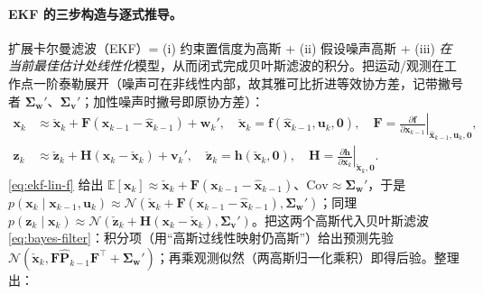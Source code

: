 \paragraph{EKF 的三步构造与逐式推导。}
扩展卡尔曼滤波（EKF）= (i) 约束置信度为高斯 + (ii) 假设噪声高斯 + (iii) \emph{在当前最佳估计处线性化}模型，从而闭式完成贝叶斯滤波的积分\cite{barfoot2024state,gaoxiang2019slam14}。把运动/观测在工作点一阶泰勒展开（噪声可在非线性内部，故其雅可比折进等效协方差，记带撇号者 $\boldsymbol{\Sigma}_{\mathbf{w}}'$、$\boldsymbol{\Sigma}_{\mathbf{v}}'$；加性噪声时撇号即原协方差）：
\begin{align}
  \mathbf{x}_k&\approx\check{\mathbf{x}}_k+\mathbf{F}(\mathbf{x}_{k-1}-\hat{\mathbf{x}}_{k-1})+\mathbf{w}_k',\quad
  \check{\mathbf{x}}_k=\mathbf{f}(\hat{\mathbf{x}}_{k-1},\mathbf{u}_k,\mathbf{0}),\quad
  \mathbf{F}=\left.\frac{\partial\mathbf{f}}{\partial\mathbf{x}_{k-1}}\right|_{\hat{\mathbf{x}}_{k-1},\mathbf{u}_k,\mathbf{0}},\label{eq:ekf-lin-f}\\
  \mathbf{z}_k&\approx\check{\mathbf{z}}_k+\mathbf{H}(\mathbf{x}_k-\check{\mathbf{x}}_k)+\mathbf{v}_k',\quad
  \check{\mathbf{z}}_k=\mathbf{h}(\check{\mathbf{x}}_k,\mathbf{0}),\quad
  \mathbf{H}=\left.\frac{\partial\mathbf{h}}{\partial\mathbf{x}_k}\right|_{\check{\mathbf{x}}_k,\mathbf{0}}.\label{eq:ekf-lin-h}
\end{align}
\cref{eq:ekf-lin-f} 给出 $\mathbb{E}[\mathbf{x}_k]\approx\check{\mathbf{x}}_k+\mathbf{F}(\mathbf{x}_{k-1}-\hat{\mathbf{x}}_{k-1})$、$\mathrm{Cov}\approx\boldsymbol{\Sigma}_{\mathbf{w}}'$，于是 $p(\mathbf{x}_k\mid\mathbf{x}_{k-1},\mathbf{u}_k)\approx\mathcal{N}(\check{\mathbf{x}}_k+\mathbf{F}(\mathbf{x}_{k-1}-\hat{\mathbf{x}}_{k-1}),\boldsymbol{\Sigma}_{\mathbf{w}}')$；同理 $p(\mathbf{z}_k\mid\mathbf{x}_k)\approx\mathcal{N}(\check{\mathbf{z}}_k+\mathbf{H}(\mathbf{x}_k-\check{\mathbf{x}}_k),\boldsymbol{\Sigma}_{\mathbf{v}}')$。把这两个高斯代入贝叶斯滤波 \cref{eq:bayes-filter}：积分项（用“高斯过线性映射仍高斯”）给出预测先验 $\mathcal{N}(\check{\mathbf{x}}_k,\mathbf{F}\hat{\mathbf{P}}_{k-1}\mathbf{F}^\top+\boldsymbol{\Sigma}_{\mathbf{w}}')$；再乘观测似然（两高斯归一化乘积）即得后验。整理出：

